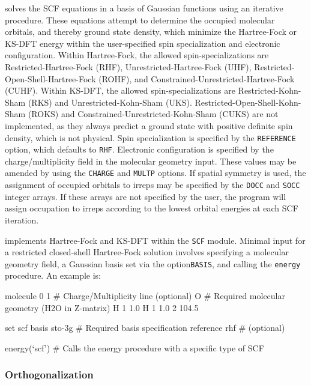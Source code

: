 \PSIfour solves the SCF equations in a basis of Gaussian functions using an
iterative procedure. These equations attempt to determine the occupied molecular
orbitals, and thereby ground state density, which minimize the Hartree-Fock or
KS-DFT energy within the user-specified spin specialization and electronic
configuration. Within Hartree-Fock, the allowed spin-specializations are
Restricted-Hartree-Fock (RHF), Unrestricted-Hartree-Fock (UHF),
Restricted-Open-Shell-Hartree-Fock (ROHF), and
Constrained-Unrestricted-Hartree-Fock (CUHF). Within KS-DFT, the allowed
spin-specializations are Restricted-Kohn-Sham (RKS) and Unrestricted-Kohn-Sham
(UKS). Restricted-Open-Shell-Kohn-Sham (ROKS) and
Constrained-Unrestricted-Kohn-Sham (CUKS) are not implemented, as they always
predict a ground state with positive definite spin density, which is not
physical. Spin specialization is specified by the \texttt{REFERENCE} option,
which defaults to \texttt{RHF}.  Electronic configuration is specified by the
charge/multiplicity field in the molecular geometry input. These values may be
amended by using the \texttt{CHARGE} and \texttt{MULTP} options. If spatial
symmetry is used, the assignment of occupied orbitals to irreps may be specified
by the \texttt{DOCC} and \texttt{SOCC} integer arrays. If these arrays are not
specified by the user, the program will assign occupation to irreps according to
the lowest orbital energies at each SCF iteration.  

\PSIfour implements Hartree-Fock and KS-DFT within the \texttt{SCF} module.
Minimal input for a restricted closed-shell Hartree-Fock solution involves
specifying a molecular geometry field, a Gaussian basis set via the
option\texttt{BASIS}, and calling the \texttt{energy} procedure. An example is:
\begin{Snippet}
molecule {
0 1              # Charge/Multiplicity line (optional)
O                # Required molecular geometry (H2O in Z-matrix)
H 1 1.0
H 1 1.0 2 104.5
}

set scf {        
basis sto-3g     # Required basis specification
reference rhf    # (optional)
}

energy(`scf')    # Calls the energy procedure with a specific type of SCF
\end{Snippet}

\subsubsection{Orthogonalization}

